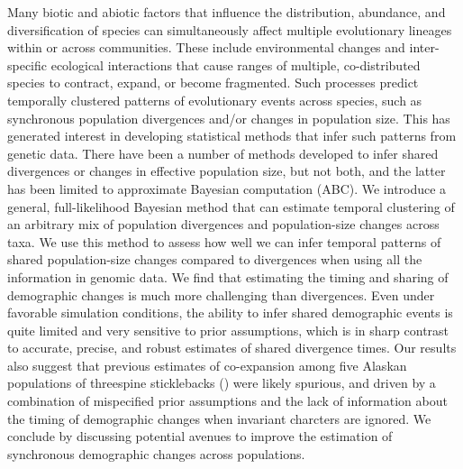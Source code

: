 Many biotic and abiotic factors that influence the distribution, abundance, and
diversification of species can simultaneously affect multiple evolutionary
lineages within or across communities.
These include environmental changes and inter-specific ecological interactions
that cause ranges of multiple, co-distributed species to contract,
expand, or become fragmented.
Such processes predict temporally clustered patterns of evolutionary events
across species, such as synchronous population divergences and/or changes in
population size.
This has generated interest in developing statistical methods that infer such
patterns from genetic data.
There have been a number of methods developed to infer shared divergences or
changes in effective population size, but not both, and the latter has been
limited to approximate Bayesian computation (ABC).
We introduce a general, full-likelihood Bayesian method that can estimate
temporal clustering of an arbitrary mix of population divergences and
population-size changes across taxa.
We use this method to assess how well we can infer temporal patterns of shared
population-size changes compared to divergences when using all the information
in genomic data.
We find that estimating the timing and sharing of demographic changes is much
more challenging than divergences.
Even under favorable simulation conditions, the ability to infer shared
demographic events is quite limited and very sensitive to prior assumptions,
which is in sharp contrast to accurate, precise, and robust estimates of shared
divergence times.
Our results also suggest that previous estimates of co-expansion among five
Alaskan populations of threespine sticklebacks ()
were likely spurious, and driven by a combination of mispecified prior
assumptions and the lack of information about the timing of demographic changes
when invariant charcters are ignored.
We conclude by discussing potential avenues to improve the estimation of
synchronous demographic changes across populations.

